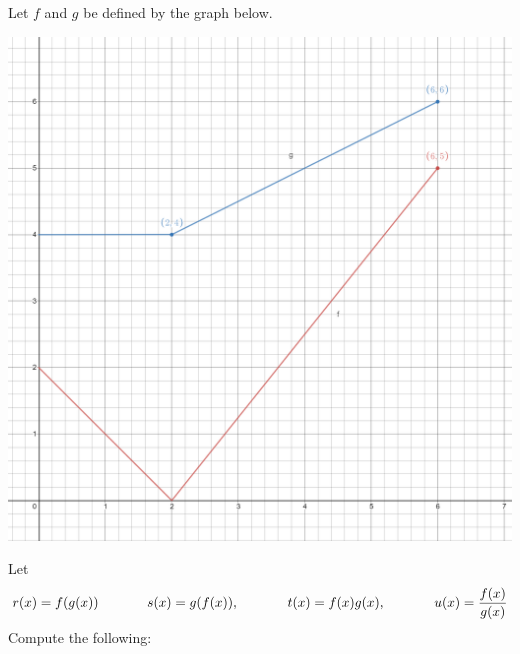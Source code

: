 \documentclass[11pt]{exam}
\begin{document}
\begin{questions}
		\question[10] Let $f$ and $g$ be defined by the graph below.
		
		\includegraphics[width = 5 in]{images/desmos-lab-5.png}
		
		Let
		\[
		r(x) = f(g(x)) \hspace{.5 in} s(x) = g(f(x)), \hspace{.5 in} t(x) = f(x)g(x), \hspace{.5 in} u(x) = \frac{f(x)}{g(x)}
		\]
		Compute the following:
		\begin{multicols}{2}
\end{multicols}
\end{questions}
\end{document}
